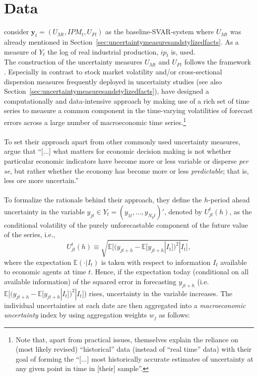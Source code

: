 \documentclass[a4paper,11pt,listof=nochaptergap,oneside,pointednumbers,bibtotoc,bigheadings,liststotoc,hidelinks]{scrbook}
\theoremstyle{mysatz}
\theoremstyle{mydefinition}
\theoremstyle{mytheorem}
\theoremstyle{mybemerkung}
\newcommand{\vect}[1]{\boldsymbol{\mathbf{#1}}}
\begin{document}
\chapter{Data}
\label{sec:Data}

\citep{ludvigsonetal:18, ludvigsonetal:19} consider $\vect{y}_t = (U_{Mt}, IPM_{t}, U_{Ft})$ as the baseline-SVAR-system where $U_{Mt}$ was already mentioned in Section~\ref{sec:uncertaintymeasuresandstylizedfacts}. As a measure of $Y_t$ the log of real industrial production, $ip_t$ is, used. \\

The construction of the uncertainty measures $U_{Mt}$ and $U_{Ft}$ follows the framework \citet{juradoetal:15}. Especially in contrast to stock market volatility and/or cross-sectional dispersion measures frequently deployed in uncertainty studies (see also Section~\ref{sec:uncertaintymeasuresandstylizedfacts}), \citet{juradoetal:15} have designed a computationally and data-intensive approach by making use of a rich set of time series to measure a common component in the time-varying volatilities of forecast errors across a large number of macroeconomic time series.\footnote{Note that, apart from practical issues, \citet[p. 1191]{juradoetal:15} themselves explain the reliance on (most likely revised) ``historical'' data (instead of ``real time'' data) with their goal of forming the ``[...] most historically accurate estimates of uncertainty at any given point in time in [their] sample''.}\\
\\
To set their approach apart from other commonly used uncertainty measures, \citet[p. 1178]{juradoetal:15} argue that ``[...] what matters for economic decision making is not whether particular economic indicators have become more or less variable or disperse \textit{per se}, but rather whether the economy has become more or less \textit{predictable}; that is, less ore more uncertain.''\\
\\
To formalize the rationale behind their approach, they define the $h$-period ahead uncertainty in the variable $y_{jt} \in Y_t = (y_{1t}, \ldots, y_{N_{y}t})'$, denoted by $U^t_{jt}(h)$, as the conditional volatility of the purely unforecastable component of the future value of the series, i.e.,
\begin{equation} \label{eq:juradoetal_1}
U^t_{jt}(h) \equiv \sqrt{\mathbb{E}\Big[(y_{jt+h} - \mathbb{E}[y_{jt+h}|I_t])^2|I_t\Big]},
\end{equation}
where the expectation $\mathbb{E}(\cdot|I_t)$ is taken with respect to information $I_t$ available to economic agents at time $t$. Hence, if the expectation today (conditional on all available information) of the squared error in forecasting $y_{jt+h}$ (i.e. $\mathbb{E}\Big[(y_{jt+h} - \mathbb{E}[y_{jt+h}|I_t])^2|I_t\Big]$) rises, uncertainty in the variable increases. The individual uncertainties at each date are then aggregated into a \textit{macroeconomic uncertainty} index by using aggregation weights $w_j$ as follows:
\end{document}
